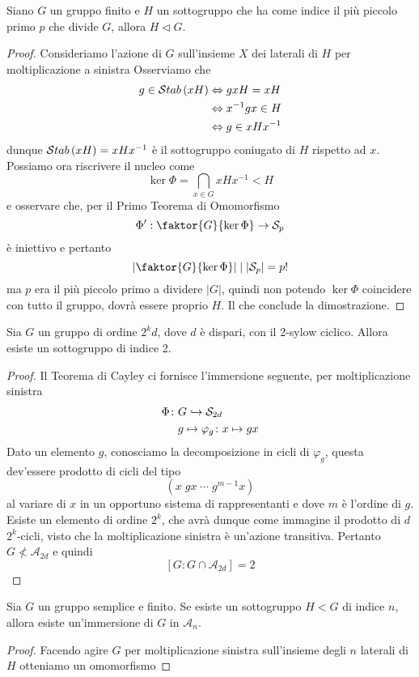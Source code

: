 \begin{multicols}{2}
	
	\begin{prop}\label{ppp}
		Siano $ G $ un gruppo finito e $ H $ un sottogruppo che ha come indice il più piccolo primo $ p $ che divide $ G $, allora $ H \lhd G $.
	\end{prop}
	\begin{proof}
		Consideriamo l'azione di $ G $ sull'insieme $ X $ dei laterali di $ H $ per moltiplicazione a sinistra 
		Osserviamo che 
		\begin{align*}
		g \in \Stab{xH} &\Leftrightarrow gxH = xH \\
		&\Leftrightarrow x^{-1}gx \in H \\
		&\Leftrightarrow g \in xHx^{-1} \\
		\end{align*}
		dunque $ \Stab{xH} = xHx^{-1} $ è il sottogruppo coniugato di $ H $ rispetto ad $ x $. Possiamo ora riscrivere il nucleo come
		\[ \ker\Phi = \bigcap_{x \in G} xHx^{-1} < H \]
		e osservare che, per il Primo Teorema di Omomorfismo
		\[ \Phi ' : \faktor{G}{\ker\Phi} \rightarrow \mathcal{S}_p \]
		è iniettivo e pertanto
		\[ \left| \faktor{G}{\ker\Phi} \right| \mid |\mathcal{S}_p| = p! \]
		ma $ p $ era il più piccolo primo a dividere $ |G| $, quindi non potendo $ \ker\Phi $ coincidere con tutto il gruppo, dovrà essere proprio $ H $. Il che conclude la dimostrazione.
	\end{proof}
	
	\begin{prop}
		Sia $ G $ un gruppo di ordine $ 2^kd $, dove $ d $ è dispari, con il 2-sylow ciclico. Allora esiste un sottogruppo di indice 2.
	\end{prop}
	\begin{proof}
		Il Teorema di Cayley ci fornisce l'immersione seguente, per moltiplicazione sinistra
		\begin{align*}
		\Phi \colon & G \hookrightarrow \S_{2d} \\
		& g \mapsto \varphi_g \colon x \mapsto gx
		\end{align*}
		Dato un elemento $ g $, conosciamo la decomposizione in cicli di $ \varphi_g $, questa dev'essere prodotto di cicli del tipo
		$$  (x \; gx \; \cdots \; g^{m-1}x)  $$
		al variare di $ x $ in un opportuno sistema di rappresentanti e dove $ m $ è l'ordine di $ g $. Esiste un elemento di ordine $ 2^k $, che avrà dunque come immagine il prodotto di $ d $ $2^k $-cicli, visto che la moltiplicazione sinistra è un'azione transitiva. Pertanto $ G \nless \mathcal{A}_{2d} $ e quindi $$  [G : G \cap \mathcal{A}_{2d}] = 2  $$
	\end{proof}
	\columnbreak
	\begin{prop}
		Sia $ G $ un gruppo semplice e finito. Se esiste un sottogruppo $ H < G $ di indice $ n $, allora esiste un'immersione di $ G $ in $ \mathcal{A}_n $.
	\end{prop}
	\begin{proof}
		Facendo agire $ G $ per moltiplicazione sinistra sull'insieme degli $ n $ laterali di $ H $ otteniamo un omomorfismo
		

\end{proof}
\end{multicols}
